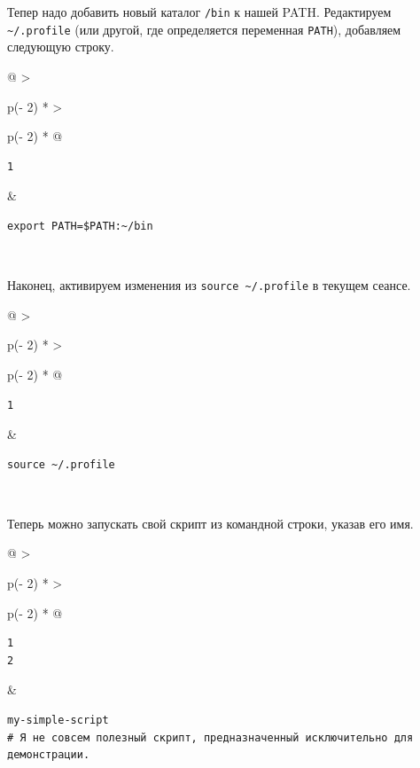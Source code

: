 \documentclass{report}
\begin{document}
Тепер надо добавить новый каталог \texttt{/bin} к нашей PATH.
Редактируем \texttt{\textasciitilde{}/.profile} (или другой, где
определяется переменная \texttt{PATH}), добавляем следующую строку.

\begin{longtable}[]{@{}
  >{\raggedright\arraybackslash}p{(\columnwidth - 2\tabcolsep) * }
  >{\raggedright\arraybackslash}p{(\columnwidth - 2\tabcolsep) * }@{}}
\toprule
\endhead
\begin{minipage}[t]{\linewidth}\raggedright
\begin{verbatim}
1
\end{verbatim}
\end{minipage} & \begin{minipage}[t]{\linewidth}\raggedright
\begin{verbatim}
export PATH=$PATH:~/bin
\end{verbatim}
\end{minipage} \\ \addlinespace
\bottomrule
\end{longtable}

Наконец, активируем изменения из
\texttt{source\ \textasciitilde{}/.profile} в текущем сеансе.

\begin{longtable}[]{@{}
  >{\raggedright\arraybackslash}p{(\columnwidth - 2\tabcolsep) * }
  >{\raggedright\arraybackslash}p{(\columnwidth - 2\tabcolsep) * }@{}}
\toprule
\endhead
\begin{minipage}[t]{\linewidth}\raggedright
\begin{verbatim}
1
\end{verbatim}
\end{minipage} & \begin{minipage}[t]{\linewidth}\raggedright
\begin{verbatim}
source ~/.profile
\end{verbatim}
\end{minipage} \\ \addlinespace
\bottomrule
\end{longtable}

Теперь можно запускать свой скрипт из командной строки, указав его имя.

\begin{longtable}[]{@{}
  >{\raggedright\arraybackslash}p{(\columnwidth - 2\tabcolsep) * }
  >{\raggedright\arraybackslash}p{(\columnwidth - 2\tabcolsep) * }@{}}
\toprule
\endhead
\begin{minipage}[t]{\linewidth}\raggedright
\begin{verbatim}
1
2
\end{verbatim}
\end{minipage} & \begin{minipage}[t]{\linewidth}\raggedright
\begin{verbatim}
my-simple-script
# Я не совсем полезный скрипт, предназначенный исключительно для демонстрации.
\end{verbatim}
\end{minipage} \\ \addlinespace
\bottomrule
\end{longtable}
\end{document}
